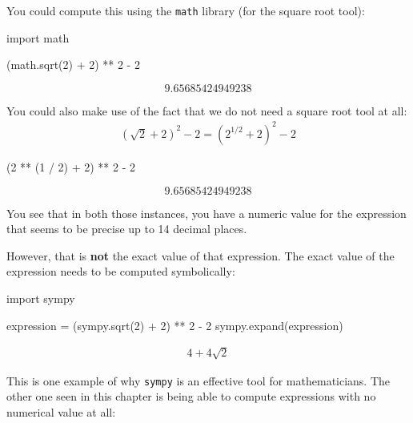 \begin{pyin}
You could compute this using the \texttt{math} library (for the square root tool):

\begin{pyin}
import math

(math.sqrt(2) + 2) ** 2 - 2
\end{pyin}





\[
9.65685424949238
\]





You could also make use of the fact that we do not need a square root tool at all:
\begin{equation*}
\begin{split}
    (\sqrt{2} + 2) ^ 2 - 2 = (2 ^ {1 / 2} + 2) ^ 2 - 2
\end{split}
\end{equation*}



\begin{pyin}
(2 ** (1 / 2) + 2) ** 2 - 2
\end{pyin}





\[
9.65685424949238
\]


You see that in both those instances, you have a numeric value for the expression
that seems to be precise up to 14 decimal places.


However, that is \textbf{not} the exact value of that expression. The exact value of
the expression needs to be computed symbolically:




\begin{pyin}
import sympy

expression = (sympy.sqrt(2) + 2) ** 2 - 2
sympy.expand(expression)
\end{pyin}




\begin{equation*}
\begin{split}\displaystyle 4 + 4 \sqrt{2}\end{split}
\end{equation*}




This is one example of why \texttt{sympy} is an effective tool for mathematicians.
The other one seen in this chapter is being able to compute expressions with no
numerical value at all:





\end{pyin}

